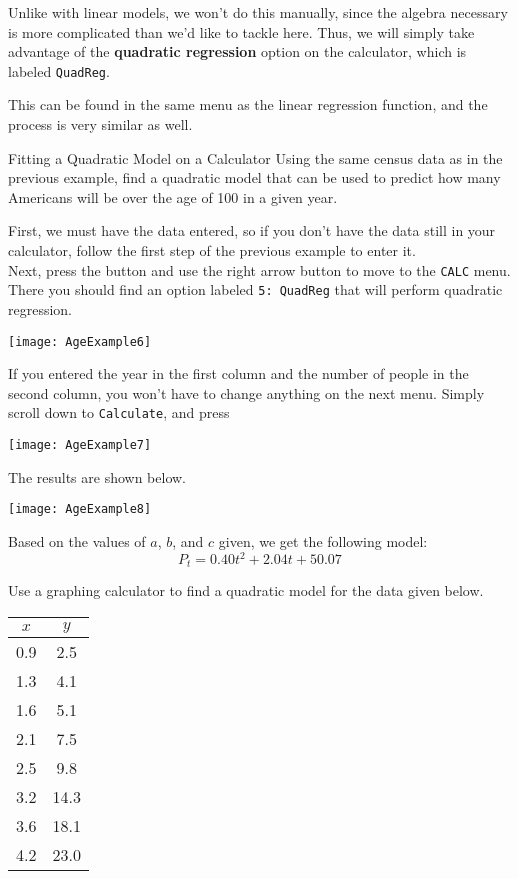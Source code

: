 Unlike with linear models, we won't do this manually, since the algebra necessary is more complicated than we'd like to tackle here.  Thus, we will simply take advantage of the \textbf{quadratic regression} option on the calculator, which is labeled \texttt{QuadReg}.

This can be found in the same menu as the linear regression function, and the process is very similar as well.
\pagebreak

\begin{example}{Fitting a Quadratic Model on a Calculator}
Using the same census data as in the previous example, find a quadratic model that can be used to predict how many Americans will be over the age of 100 in a given year.

\sol
First, we must have the data entered, so if you don't have the data still in your calculator, follow the first step of the previous example to enter it.\\

Next, press the  button and use the right arrow button to move to the \texttt{CALC} menu.  There you should find an option labeled \texttt{5: QuadReg} that will perform quadratic regression.

\begin{center}
\texttt{[image: AgeExample6]}
\end{center}

If you entered the year in the first column and the number of people in the second column, you won't have to change anything on the next menu.  Simply scroll down to \texttt{Calculate}, and press 

\begin{center}
\texttt{[image: AgeExample7]}
\end{center}

The results are shown below.

\begin{center}
\texttt{[image: AgeExample8]}
\end{center}

Based on the values of $a$, $b$, and $c$ given, we get the following model:
\[\boxed{P_t = 0.40t^2 + 2.04t + 50.07}\]
\end{example}

\begin{try}
Use a graphing calculator to find a quadratic model for the data given below.
\begin{center}
\begin{tabular}{c c}
$x$ & $y$\\
\hline
0.9 & 2.5\\
1.3 & 4.1\\
1.6 & 5.1\\
2.1 & 7.5\\
2.5 & 9.8\\
3.2 & 14.3\\
3.6 & 18.1\\
4.2 & 23.0
\end{tabular}
\end{center}
\end{try}
\pagebreak

